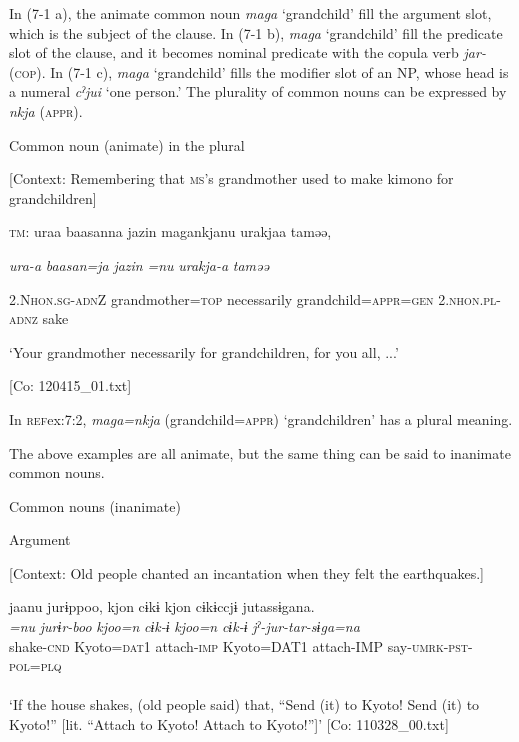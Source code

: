 In (7-1 a), the animate common noun \textit{maga} ‘grandchild’ fill the argument slot, which is the subject of the clause. In (7-1 b), \textit{maga} ‘grandchild’ fill the predicate slot of the clause, and it becomes nominal predicate with the copula verb \textit{jar-} (\textsc{cop}). In (7-1 c), \textit{maga} ‘grandchild’ fills the modifier slot of an NP, whose head is a numeral \textit{cˀjui} ‘one person.’ The plurality of common nouns can be expressed by \textit{nkja} (\textsc{appr}).

\ea \label{ex:7:2}  Common noun (animate) in the plural

  [Context: Remembering that \textsc{ms}’s grandmother used to make kimono for grandchildren]

  \textsc{tm}:  uraa  baasanna  jazin  magankjanu urakjaa  taməə,

    \textit{ura-a}  \textit{baasan=ja}  \textit{jazin}  \textit{=nu}   \textit{urakja-a}  \textit{taməə}

    2.N\textsc{hon}.\textsc{sg}-\textsc{adn}Z  grandmother=\textsc{top}  necessarily  grandchild=\textsc{appr}=\textsc{gen}  2.\textsc{nhon}.\textsc{pl}-\textsc{adnz}  sake
    
    ‘Your grandmother necessarily for grandchildren, for you all, ...’

    [Co: 120415\_01.txt]
\z

In \textsc{ref}{ex:7:2}, \textit{maga=nkja} (grandchild=\textsc{appr}) ‘grandchildren’ has a plural meaning.

  The above examples are all animate, but the same thing can be said to inanimate common nouns.

\ea \label{ex:7:3}  Common nouns (inanimate)

\ea \label{ex:7:3a}Argument

    [Context: Old people chanted an incantation when they felt the earthquakes.]

\gllll  jaanu  jurɨppoo,  kjon  cɨkɨ  kjon   cɨkɨccjɨ  jutassɨgana.\\
\textit{=nu}  \textit{jurɨr-boo}  \textit{kjoo=n}  \textit{cɨk-ɨ}  \textit{kjoo=n}   \textit{cɨk-ɨ}  \textit{jˀ-jur-tar-sɨga=na}\\
[house=\textsc{nom}]  shake-\textsc{cnd}  Kyoto=\textsc{dat}1  attach-\textsc{imp}  Kyoto=DAT1  attach-IMP  say-\textsc{umrk}-\textsc{pst}-\textsc{pol}=\textsc{plq}\\
[Subject]        \\
\glt ‘If the house shakes, (old people said) that, “Send (it) to Kyoto! Send (it) to Kyoto!” [lit. “Attach to Kyoto! Attach to Kyoto!”]’ [Co: 110328\_00.txt]

